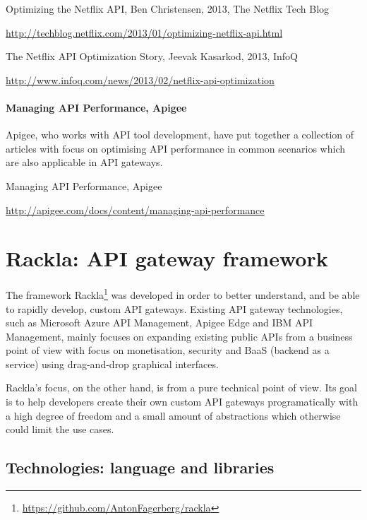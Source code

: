 \documentclass{cslthse-msc}
\begin{document}
\vspace{5mm}

\noindent Optimizing the Netflix API, Ben Christensen, 2013, The Netflix Tech Blog

\noindent \url{http://techblog.netflix.com/2013/01/optimizing-netflix-api.html}

\vspace{5mm}

\noindent The Netflix API Optimization Story, Jeevak Kasarkod, 2013, InfoQ

\noindent \url{http://www.infoq.com/news/2013/02/netflix-api-optimization}


\subsubsection{Managing API Performance, Apigee}
Apigee, who works with API tool development, have put together a collection of articles with focus on optimising API performance in common scenarios which are also applicable in API gateways.

\vspace{5mm}

\noindent Managing API Performance, Apigee

\noindent \url{http://apigee.com/docs/content/managing-api-performance}

\chapter{Rackla: API gateway framework}

The framework Rackla\footnote{\url{https://github.com/AntonFagerberg/rackla}} was developed in order to better understand, and be able to rapidly develop, custom API gateways. Existing API gateway technologies, such as Microsoft Azure API Management\cite{azure_api_management}, Apigee Edge\cite{apigee_edge} and IBM API Management\cite{ibm_api_management}, mainly focuses on expanding existing public APIs from a business point of view with focus on monetisation, security and BaaS (backend as a service) using drag-and-drop graphical interfaces. 

Rackla's focus, on the other hand, is from a pure technical point of view. Its goal is to help developers create their own custom API gateways programatically with a high degree of freedom and a small amount of abstractions which otherwise could limit the use cases.

\section{Technologies: language and libraries}
\end{document}
